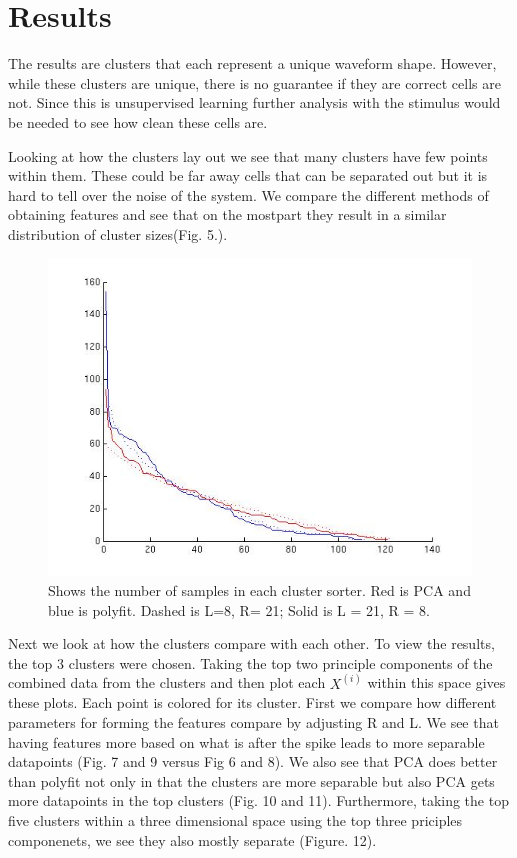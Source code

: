 \documentclass[conference]{IEEEtran}
\begin{document}
\section{Results}

The results are clusters that each represent a unique
waveform shape. However, while these clusters are unique, there is no
guarantee if they are correct cells are not. Since this is
unsupervised learning further analysis with the stimulus would be
needed to see how clean these cells are.

Looking at how the clusters lay out we see that many clusters have few
points within them. These could be far away cells that can be
separated out but it is hard to tell over the noise of the system. We
compare the different methods of obtaining features and see that on
the mostpart they result in a similar distribution of cluster sizes(Fig. 5.).

\begin{figure}
\centering
\includegraphics[width=0.9\linewidth]{traces/clusthistcount.jpg}
\caption{Shows the number of samples in each cluster sorter. Red is
  PCA and blue is polyfit. Dashed is L=8, R= 21; Solid is L = 21, R = 8.}
\end{figure}

Next we look at how the clusters compare with each other.  To view the
results, the top 3 clusters were chosen. Taking the top two
principle components of the combined data from the clusters and then
plot each $X^{(i)}$ within this space gives these plots. Each point is colored for its
cluster. First we compare how different parameters for forming the
features compare by adjusting R and L. We see that having features
more based on what is after the spike leads to more separable
datapoints (Fig. 7 and 9 versus Fig 6 and 8). We also see that PCA
does better than polyfit not only in that the clusters are more
separable but also PCA gets more
datapoints in the top clusters (Fig. 10 and 11). Furthermore, taking the top five
clusters within a three dimensional space using the top three
priciples componenets, we see they also mostly separate (Figure. 12).
\end{document}
